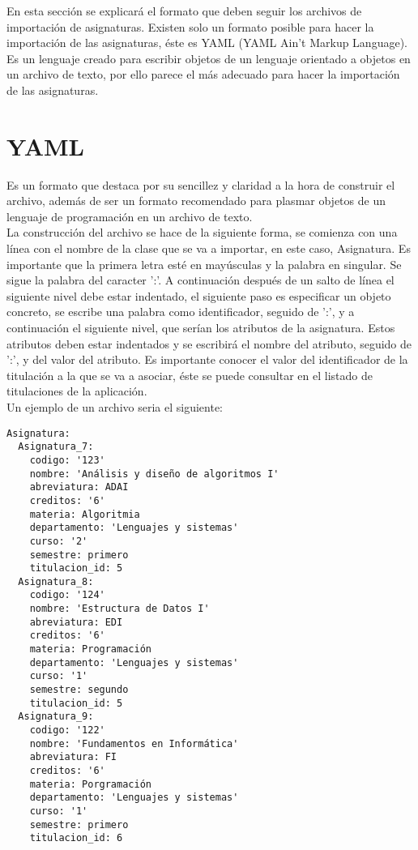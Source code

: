 En esta sección se explicará el formato que deben seguir los archivos de importación de asignaturas. Existen solo un formato posible para hacer la importación de las asignaturas, éste es YAML (YAML Ain't Markup Language). Es un lenguaje creado para escribir objetos de un lenguaje orientado a objetos en un archivo de texto, por ello parece el más adecuado para hacer la importación de las asignaturas.

\section{YAML}

Es un formato que destaca por su sencillez y claridad a la hora de construir el archivo, además de ser un formato recomendado para plasmar objetos de un lenguaje de programación en un archivo de texto.
\\
La construcción del archivo se hace de la siguiente forma, se comienza con una línea con el nombre de la clase que se va a importar, en este caso, Asignatura. Es importante que la primera letra esté en mayúsculas y la palabra en singular. Se sigue la palabra del caracter ':'. A continuación después de un salto de línea el siguiente nivel debe estar indentado, el siguiente paso es especificar un objeto concreto, se escribe una palabra como identificador, seguido de ':', y a continuación el siguiente nivel, que serían los atributos de la asignatura. Estos atributos deben estar indentados y se escribirá el nombre del atributo, seguido de ':', y del valor del atributo. Es importante conocer el valor del identificador de la titulación a la que se va a asociar, éste se puede consultar en el listado de titulaciones de la aplicación.
\\
Un ejemplo de un archivo seria el siguiente:
\begin{verbatim}
Asignatura:
  Asignatura_7:
    codigo: '123'
    nombre: 'Análisis y diseño de algoritmos I'
    abreviatura: ADAI
    creditos: '6'
    materia: Algoritmia
    departamento: 'Lenguajes y sistemas'
    curso: '2'
    semestre: primero
    titulacion_id: 5
  Asignatura_8:
    codigo: '124'
    nombre: 'Estructura de Datos I'
    abreviatura: EDI
    creditos: '6'
    materia: Programación
    departamento: 'Lenguajes y sistemas'
    curso: '1'
    semestre: segundo
    titulacion_id: 5
  Asignatura_9:
    codigo: '122'
    nombre: 'Fundamentos en Informática'
    abreviatura: FI
    creditos: '6'
    materia: Porgramación
    departamento: 'Lenguajes y sistemas'
    curso: '1'
    semestre: primero
    titulacion_id: 6
\end{verbatim}

